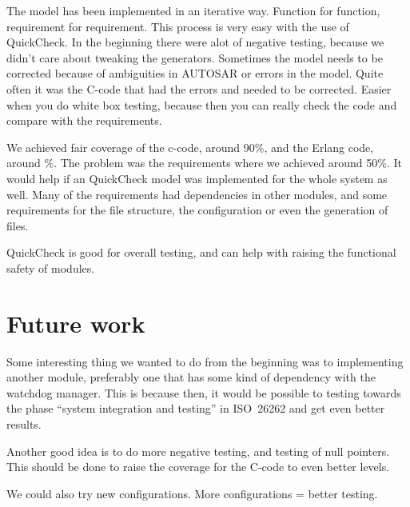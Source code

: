 
The model has been implemented in an iterative way. Function for function,
requirement for requirement. This process is very easy with the use of
QuickCheck.
In the beginning there were alot of negative testing, because we didn't care
about tweaking the generators.
Sometimes the model needs to be corrected because of ambiguities in AUTOSAR or
errors in the model. Quite often it was the C-code that had the errors and
needed to be corrected.
Easier when you do white box testing, because then you can really check the code
and compare with the requirements.

We achieved fair coverage of the c-code, around 90\%, and the Erlang code,
around \%. The problem was the requirements where we achieved around 50\%. It
would help if an QuickCheck model was implemented for the whole system as
well. Many of the requirements had dependencies in other modules, and some
requirements for the file structure, the configuration or even the generation of
files.

QuickCheck is good for overall testing, and can help with raising the functional
safety of modules.


\section{Future work}
Some interesting thing we wanted to do from the beginning was to implementing another module, preferably one that has some kind of dependency with the watchdog manager. This is because then, it would be possible to testing towards the phase ``system integration and testing'' in ISO~26262 and get even better results.

Another good idea is to do more negative testing, and testing of null pointers. This should be done to raise the coverage for the C-code to even better levels.

We could also try new configurations. More configurations = better testing.